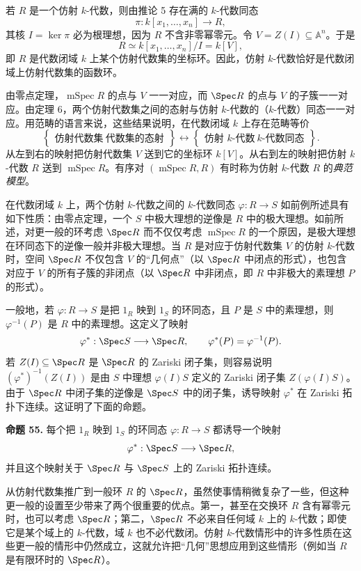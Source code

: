 若 $R$ 是一个仿射 $k$-代数，则由推论 5 存在满的 $k$-代数同态
\[
\pi:k[x_1,\ldots,x_n]\longrightarrow R,
\]
其核 $I=\ker\pi$ 必为根理想，因为 $R$ 不含非零幂零元。令 $V=Z(I)\subseteq\mathbb A^n$。于是
\[
R\simeq k[x_1,\ldots,x_n]/I=k[V],
\]
即 $R$ 是代数闭域 $k$ 上某个仿射代数集的坐标环。因此，仿射 $k$-代数恰好是代数闭域上仿射代数集的函数环。

由零点定理，$\operatorname{mSpec}R$ 的点与 $V$ 一一对应，而 $\Spec R$ 的点与 $V$ 的子簇一一对应。由定理 6，两个仿射代数集之间的态射与仿射 $k$-代数的（$k$-代数）同态一一对应。用范畴的语言来说，这些结果说明，在代数闭域 $k$ 上存在范畴等价
\[
\left\{
\begin{array}{c}
	\text{仿射代数集}\
	\text{代数集的态射}
\end{array}
\right\}
\longleftrightarrow
\left\{
\begin{array}{c}
	\text{仿射 $k$-代数}\
	\text{$k$-代数同态}
\end{array}
\right\}.
\]
从左到右的映射把仿射代数集 $V$ 送到它的坐标环 $k[V]$。从右到左的映射把仿射 $k$-代数 $R$ 送到 $\operatorname{mSpec}R$。有序对 $(\operatorname{mSpec}R,R)$ 有时称为仿射 $k$-代数 $R$ 的\emph{典范模型}。

在代数闭域 $k$ 上，两个仿射 $k$-代数之间的 $k$-代数同态 $\varphi:R\to S$ 如前例所述具有如下性质：由零点定理，一个 $S$ 中极大理想的逆像是 $R$ 中的极大理想。如前所述，对更一般的环考虑 $\Spec R$ 而不仅仅考虑 $\operatorname{mSpec}R$ 的一个原因，是极大理想在环同态下的逆像一般并非极大理想。当 $R$ 是对应于仿射代数集 $V$ 的仿射 $k$-代数时，空间 $\Spec R$ 不仅包含 $V$ 的“几何点”（以 $\Spec R$ 中闭点的形式），也包含对应于 $V$ 的所有子簇的非闭点（以 $\Spec R$ 中非闭点，即 $R$ 中非极大的素理想 $P$ 的形式）。

一般地，若 $\varphi:R\to S$ 是把 $1_R$ 映到 $1_S$ 的环同态，且 $P$ 是 $S$ 中的素理想，则 $\varphi^{-1}(P)$ 是 $R$ 中的素理想。这定义了映射
\[
\varphi^*:\Spec S\longrightarrow\Spec R,
\qquad
\varphi^*(P)=\varphi^{-1}(P).
\]
若 $Z(I)\subseteq\Spec R$ 是 $\Spec R$ 的 Zariski 闭子集，则容易说明 $(\varphi^*)^{-1}(Z(I))$ 是由 $S$ 中理想 $\varphi(I)S$ 定义的 Zariski 闭子集 $Z(\varphi(I)S)$。由于 $\Spec R$ 中闭子集的逆像是 $\Spec S$ 中的闭子集，诱导映射 $\varphi^*$ 在 Zariski 拓扑下连续。这证明了下面的命题。

\noindent\textbf{命题 55.} 每个把 $1_R$ 映到 $1_S$ 的环同态 $\varphi:R\to S$ 都诱导一个映射
\[
\varphi^*:\Spec S\longrightarrow\Spec R,
\]
并且这个映射关于 $\Spec R$ 与 $\Spec S$ 上的 Zariski 拓扑连续。

从仿射代数集推广到一般环 $R$ 的 $\Spec R$，虽然使事情稍微复杂了一些，但这种更一般的设置至少带来了两个很重要的优点。第一，甚至在交换环 $R$ 含有幂零元时，也可以考虑 $\Spec R$；第二，$\Spec R$ 不必来自任何域 $k$ 上的 $k$-代数；即使它是某个域上的 $k$-代数，域 $k$ 也不必代数闭。仿射 $k$-代数情形中的许多性质在这些更一般的情形中仍然成立，这就允许把“几何”思想应用到这些情形（例如当 $R$ 是有限环时的 $\Spec R$）。

